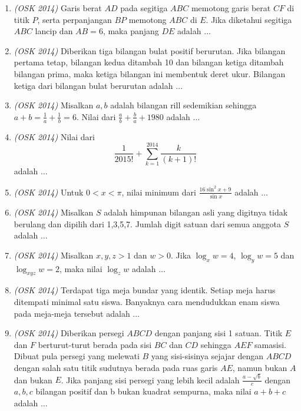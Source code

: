 \begin{enumerate}
	\item \textit{(OSK 2014)} Garis berat $AD$ pada segitiga $ABC$ memotong garis berat $CF$ di titik $P$, serta perpanjangan $BP$ memotong $ABC$ di $E$. Jika diketahui segitiga $ABC$ lancip dan $AB = 6$, maka panjang $DE$ adalah $\dots$
	
	\item \textit{(OSK 2014)} Diberikan tiga bilangan bulat positif berurutan. Jika bilangan pertama tetap, bilangan kedua ditambah 10 dan bilangan ketiga ditambah bilangan prima, maka ketiga bilangan ini membentuk deret ukur. Bilangan ketiga dari bilangan bulat berurutan adalah $\dots$
	
	\item \textit{(OSK 2014)} Misalkan $a,b$ adalah bilangan rill sedemikian sehingga $a+b = \frac{1}{a} + \frac{1}{b} = 6$. Nilai dari $\frac{a}{b} + \frac{b}{a} + 1980$ adalah $\dots$
	
	\item \textit{(OSK 2014)} Nilai dari 
	\[
	\frac{1}{2015!} + \sum_{k=1}^{2014} \frac{k}{(k+1)!}
	\]
	adalah $\dots$
	
	\item \textit{(OSK 2014)} Untuk $0 < x < \pi$, nilai minimum dari $\frac{16\sin^2 x + 9}{\sin x}$ adalah $\dots$
	
	\item \textit{(OSK 2014)} Misalkan $S$ adalah himpunan bilangan asli yang digitnya tidak berulang dan dipilih dari 1,3,5,7. Jumlah digit satuan dari semua anggota $S$ adalah $\dots$
	
	\item \textit{(OSK 2014)} Misalkan $x,y,z > 1$ dan $w > 0$. Jika $\log_x w = 4$, $\log_y w = 5$ dan $\log_{xyz} w = 2$, maka nilai $\log_z w$ adalah $\dots$
	
	\item \textit{(OSK 2014)} Terdapat tiga meja bundar yang identik. Setiap meja harus ditempati minimal satu siswa. Banyaknya cara mendudukkan enam siswa pada meja-meja tersebut adalah $\dots$
	
	\item \textit{(OSK 2014)} Diberikan persegi $ABCD$ dengan panjang sisi 1 satuan. Titik $E$ dan $F$ berturut-turut berada pada sisi $BC$ dan $CD$ sehingga $AEF$ samasisi. Dibuat pula persegi yang melewati $B$ yang sisi-sisinya sejajar dengan $ABCD$ dengan salah satu titik sudutnya berada pada ruas garis $AE$,  namun bukan $A$ dan bukan $E$. Jika panjang sisi persegi yang lebih kecil adalah $\frac{a - \sqrt{b}}{c}$ dengan $a,b,c$ bilangan positif dan b bukan kuadrat sempurna, maka nilai $a + b + c$ adalah $\dots$
	

\end{enumerate}
